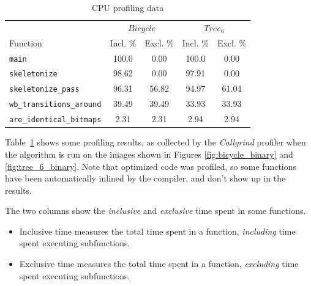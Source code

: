 \documentclass[11pt,a4paper]{article}
\begin{document}
            \begin{table}[h]
                \centering
                \begin{tabular}{lcccc}
                    \toprule
                                                  & \multicolumn{2}{c}{$Bicycle$} & \multicolumn{2}{c}{$Tree_6$} \\
                    Function                      & Incl. \% & Excl. \%           & Incl. \% & Excl. \%          \\
                    \midrule
                    \verb+main+                   & 100.0    & 0.00               & 100.0    & 0.00              \\
                    \verb+skeletonize+            & 98.62    & 0.00               & 97.91    & 0.00              \\
                    \verb+skeletonize_pass+       & 96.31    & 56.82              & 94.97    & 61.04             \\
                    \verb+wb_transitions_around+  & 39.49    & 39.49              & 33.93    & 33.93             \\
                    \verb+are_identical_bitmaps+  & 2.31     & 2.31               & 2.94     & 2.94              \\
                    \bottomrule
                \end{tabular}
                \caption{CPU profiling data}
                \label{tab:cpu_profiling_data}
            \end{table}

            Table~\ref{tab:cpu_profiling_data} shows some profiling results, as collected by the \emph{Callgrind} profiler when the algorithm is run on the images shown in Figures \ref{fig:bicycle_binary} and \ref{fig:tree_6_binary}.
            Note that optimized code was profiled, so some functions have been automatically inlined by the compiler, and don't show up in the results.

            The two columns show the \emph{inclusive} and \emph{exclusive} time spent in some functions.

            \begin{itemize}
                \item Inclusive time measures the total time spent in a function, \emph{including} time spent executing subfunctions.
                \item Exclusive time measures the total time spent in a function, \emph{excluding} time spent executing subfunctions.
            \end{itemize}
\end{document}
